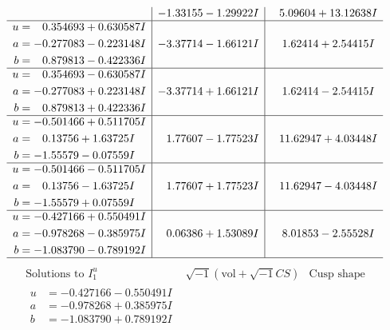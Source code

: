 \documentclass[1p]{elsarticle_modified}
\theoremstyle{definition}
\newcommand{\I}{\sqrt{-1}}
\begin{document}
$$\begin{array}{c|c|c}
 & -1.33155 - 1.29922 I & \phantom{-}5.09604 + 13.12638 I \\ \hline\begin{aligned}
u &= \phantom{-}0.354693 + 0.630587 I \\
a &= -0.277083 - 0.223148 I \\
b &= \phantom{-}0.879813 - 0.422336 I\end{aligned}
 & -3.37714 - 1.66121 I & \phantom{-}1.62414 + 2.54415 I \\ \hline\begin{aligned}
u &= \phantom{-}0.354693 - 0.630587 I \\
a &= -0.277083 + 0.223148 I \\
b &= \phantom{-}0.879813 + 0.422336 I\end{aligned}
 & -3.37714 + 1.66121 I & \phantom{-}1.62414 - 2.54415 I \\ \hline\begin{aligned}
u &= -0.501466 + 0.511705 I \\
a &= \phantom{-}0.13756 + 1.63725 I \\
b &= -1.55579 - 0.07559 I\end{aligned}
 & \phantom{-}1.77607 - 1.77523 I & \phantom{-}11.62947 + 4.03448 I \\ \hline\begin{aligned}
u &= -0.501466 - 0.511705 I \\
a &= \phantom{-}0.13756 - 1.63725 I \\
b &= -1.55579 + 0.07559 I\end{aligned}
 & \phantom{-}1.77607 + 1.77523 I & \phantom{-}11.62947 - 4.03448 I \\ \hline\begin{aligned}
u &= -0.427166 + 0.550491 I \\
a &= -0.978268 - 0.385975 I \\
b &= -1.083790 - 0.789192 I\end{aligned}
 & \phantom{-}0.06386 + 1.53089 I & \phantom{-}8.01853 - 2.55528 I\\
 \hline 
 \end{array}$$\newpage$$\begin{array}{c|c|c}  
\text{Solutions to }I^u_{1}& \I (\text{vol} + \sqrt{-1}CS) & \text{Cusp shape}\\
 \hline 
\begin{aligned}
u &= -0.427166 - 0.550491 I \\
a &= -0.978268 + 0.385975 I \\
b &= -1.083790 + 0.789192 I\end{aligned}

\end{array}$$
\end{document}
